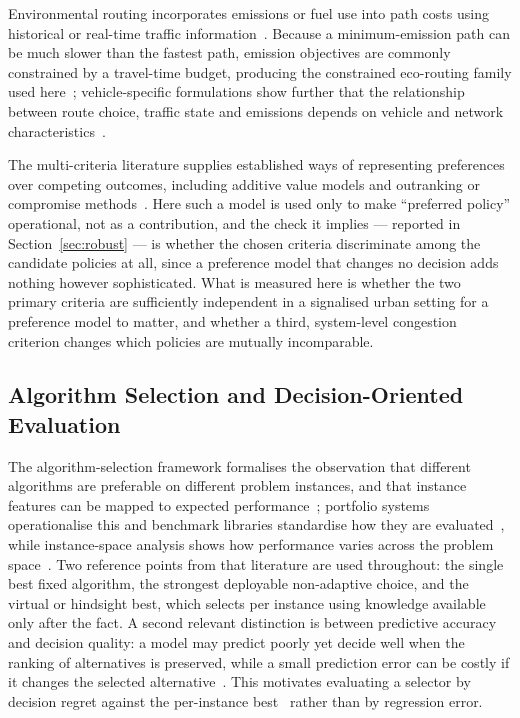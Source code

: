 Environmental routing incorporates emissions or fuel use into path costs using historical
or real-time traffic information~\cite{boriboonsomsin2012ecorouting,zeng2016prediction}.
Because a minimum-emission path can be much slower than the fastest path, emission
objectives are commonly constrained by a travel-time budget, producing the constrained
eco-routing family used here~\cite{zeng2017svm,huang2018ecorouting}; vehicle-specific
formulations show further that the relationship between route choice, traffic state and
emissions depends on vehicle and network characteristics~\cite{wang2019ecorouting}.

The multi-criteria literature supplies established ways of representing preferences over
competing outcomes, including additive value models and outranking or compromise
methods~\cite{keeney1993decisions,hwang1981multiple,opricovic2004compromise,%
brans1985preference,ehrgott2005multicriteria}. Here such a model is used only to make
``preferred policy'' operational, not as a contribution, and the check it implies ---
reported in Section~\ref{sec:robust} --- is whether the chosen criteria discriminate among
the candidate policies at all, since a preference model that changes no decision adds
nothing however sophisticated. What is measured here is whether the two primary criteria
are sufficiently independent in a signalised urban setting for a preference model to
matter, and whether a third, system-level congestion criterion changes which policies are
mutually incomparable.

\subsection{Algorithm Selection and Decision-Oriented Evaluation}

The algorithm-selection framework formalises the observation that different algorithms are
preferable on different problem instances, and that instance features can be mapped to
expected performance~\cite{rice1976algorithm}; portfolio systems operationalise this and
benchmark libraries standardise how they are
evaluated~\cite{xu2008satzilla,bischl2016aslib,kotthoff2014survey}, while instance-space
analysis shows how performance varies across the problem space~\cite{smithmiles2023isa}.
Two reference points from that literature are used throughout: the single best fixed
algorithm, the strongest deployable non-adaptive choice, and the virtual or hindsight
best, which selects per instance using knowledge available only after the fact. A second
relevant distinction is between predictive accuracy and decision quality: a model may
predict poorly yet decide well when the ranking of alternatives is preserved, while a small
prediction error can be costly if it changes the selected
alternative~\cite{elmachtoub2022smart}. This motivates evaluating a selector by decision
regret against the per-instance best~\cite{kouvelis1997robust} rather than by regression
error.

